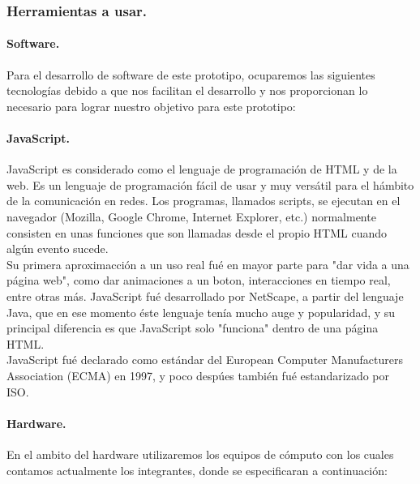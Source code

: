 \documentclass[12pt, a4paper, titlepage]{article}
\begin{document}
			\subsubsection{Herramientas a usar.}
				\paragraph{Software. \\}
				Para el desarrollo de software de este prototipo, ocuparemos las siguientes tecnologías debido a que nos facilitan el desarrollo y nos proporcionan lo necesario para lograr nuestro objetivo para este prototipo: 
				\paragraph {JavaScript. \\}
				JavaScript es considerado como el lenguaje de programación de HTML y de la web. Es un lenguaje de programación fácil de usar y muy versátil para el hámbito de la comunicación en redes. Los programas, llamados scripts, se ejecutan en el navegador (Mozilla, Google Chrome, Internet Explorer, etc.) normalmente consisten en unas funciones que son llamadas desde el propio HTML cuando algún evento sucede.\\ 
				Su primera aproximacción a un uso real fué en mayor parte para "dar vida a una página web", como dar animaciones a un boton, interacciones en tiempo real, entre otras más. 
				JavaScript fué desarrollado por NetScape, a partir del lenguaje Java, que en ese momento éste lenguaje tenía mucho auge y popularidad, y su principal diferencia es que JavaScript solo "funciona" dentro de una página HTML.\\
				JavaScript fué declarado como estándar del European Computer Manufacturers Association (ECMA) en 1997, y poco despúes también  fué estandarizado por ISO.\cite{refJavaScript} \\ 
				
				
				\paragraph{Hardware. \\}
				En el ambito del hardware utilizaremos los equipos de cómputo con los cuales contamos actualmente los integrantes, donde se especificaran a continuación: 
				
\end{document}

